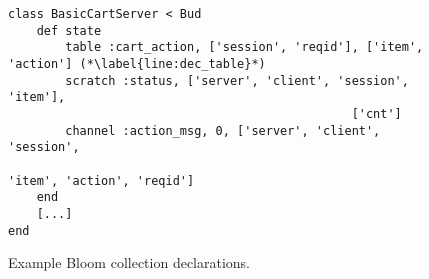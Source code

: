 \begin{comment}
\begin{figure}[t]
\begin{scriptsize}
\begin{verbatim}
 1      class SimplePQueue < Bud
 2      def state
 3        table :q, ['id'], ['payload']
 4        table :min_id, ['id']
 5        table :log, ['id'], ['payload']
 6        scratch :newmins, ['id'], ['payload']
 7        channel :output, 0, ['addr', 'id'], ['payload']
 8      end
 9    
10      declare
11      def dequeue
12        # find min_id value, agg across all items (group=nil)
13        min_id <= q.group(nil, min(q.id))
14    
15        # find the q items with min_id via natural join
16        mins = natjoin [q, min_id] {|q, m| q }
17    
18        # idempotence: ignore items with id previously logged
19        newmins <= mins.map do |q| 
20          q unless log.map{|p| p.id}.include? q.id
21        end
22
23        # in the next timestep, add newmins to log, delete from q
24        log <+ newmins.map{|h| [h.id]}
25        q <- mins.map {|q| q}
26      
27        # ship the min items via the output channel
28        output <+ mins.map{|q| ['192.168.1.1:12345'] + q}
29      end
30    end
\end{verbatim}
\vspace{-10pt}
\caption{Example Bloom code for dequeuing items from a priority queue.}
\label{fig:queue}
\end{scriptsize}
\vspace{-2pt}
\end{figure}

\end{comment}

\begin{figure}[t]
\begin{scriptsize}
\begin{lstlisting}
class BasicCartServer < Bud
	def state
		table :cart_action, ['session', 'reqid'], ['item', 'action'] (*\label{line:dec_table}*)
		scratch :status, ['server', 'client', 'session', 'item'],
												['cnt']
		channel :action_msg, 0, ['server', 'client', 'session',
																 'item', 'action', 'reqid']
	end
	[...]
end
\end{lstlisting}
\vspace{-10pt}
\caption{Example Bloom collection declarations.}
\label{fig:declarations}
\end{scriptsize}
\vspace{-2pt}
\end{figure}

